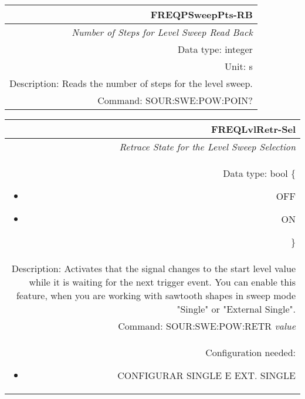 \documentclass[openany]{article}
\begin{document}
		\begin{tabular}{N}
			\hline
			\bfseries FREQPSweepPts-RB \\ \hline
			\emph{Number of Steps for Level Sweep Read Back} \\
			Data type: integer \\
			Unit: s \\
			Description: Reads the number of steps for the level sweep. \\
			Command: SOUR:SWE:POW:POIN? \\

		\end{tabular}
%
		\begin{tabular}{N}
			\hline
			\bfseries FREQLvlRetr-Sel \\ \hline
			\emph{Retrace State for the Level Sweep Selection} \\
			Data type: bool \{\begin{itemize}[noitemsep]
				\small
				\item[] OFF
				\item[] ON
			\end{itemize}\} \\
			Description: Activates that the signal changes to the start level value while it is waiting for the next trigger event. You can enable this feature, when you are working with sawtooth shapes in sweep mode "Single" or "External Single". \\
			Command: SOUR:SWE:POW:RETR \emph{value} \\
			Configuration needed:\begin{itemize}[noitemsep]
				\small
				\item[] CONFIGURAR SINGLE E EXT. SINGLE
			\end{itemize} \\

		\end{tabular}
\end{document}
